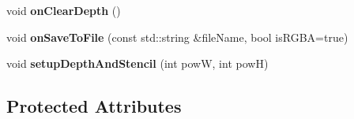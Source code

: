 \begin{DoxyCompactItemize}
\mbox{\label{classRenderTexture_ac94c214b8570de378cfcc9951e853e98}} 
void {\bfseries on\+Clear\+Depth} ()
\item 
\mbox{\label{classRenderTexture_aec7f32d06cde6a17b7325d21f27e069e}} 
void {\bfseries on\+Save\+To\+File} (const std\+::string \&file\+Name, bool is\+R\+G\+BA=true)
\item 
\mbox{\label{classRenderTexture_a7d46c01583326eb477fb8e01f18b00f0}} 
void {\bfseries setup\+Depth\+And\+Stencil} (int powW, int powH)
\end{DoxyCompactItemize}
\subsection*{Protected Attributes}
